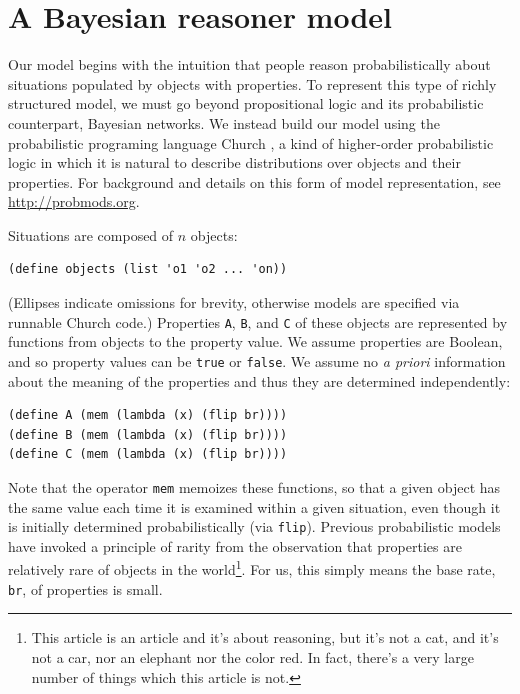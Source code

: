 \documentclass[10pt,letterpaper]{article}
\begin{document}
\section{A Bayesian reasoner model}

Our model begins with the intuition that people reason probabilistically about situations populated by objects with properties. To represent this type of richly structured model, we must go beyond propositional logic and its probabilistic counterpart, Bayesian networks. We instead build our model using the probabilistic programing language Church \cite{Goodman2008}, a kind of higher-order probabilistic logic in which it is natural to describe distributions over objects and their properties. For background and details on this form of model representation, see \url{http://probmods.org}.

Situations are composed of $n$ objects:
\begin{lstlisting}
(define objects (list 'o1 'o2 ... 'on))
\end{lstlisting}
(Ellipses indicate omissions for brevity, otherwise models are specified via runnable Church code.)
Properties \lstinline{A}, \lstinline{B}, and \lstinline{C} of these objects are represented by functions from objects to the property value. We assume properties are Boolean, and so property values can be \lstinline{true} or \lstinline{false}. We assume no \emph{a priori} information about the meaning of the properties and thus they are determined independently:
\begin{lstlisting}
(define A (mem (lambda (x) (flip br))))
(define B (mem (lambda (x) (flip br))))
(define C (mem (lambda (x) (flip br))))
\end{lstlisting}
Note that the operator \lstinline{mem} memoizes these functions, so that a given object has the same value each time it is examined within a given situation, even though it is initially determined probabilistically (via \lstinline{flip}). 
Previous probabilistic models \cite{Oaksford1994} have invoked a principle of rarity from the observation that properties are relatively rare of objects in the world\footnote{This article is an article and it's about reasoning, but it's not a cat, and it's not a car, nor an elephant nor the color red. In fact, there's a very large number of things which this article is not.}. For us, this simply means the base rate, \lstinline{br}, of properties is small.  
\end{document}
